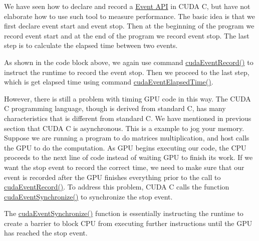 \documentclass[letterpaper,10pt,english]{sphinxmanual}
\begin{document}
We have seen how to declare and record a \href{http://developer.download.nvidia.com/compute/cuda/4\_2/rel/toolkit/docs/online/group\_\_CUDART\_\_MEMORY\_g48efa06b81cc031b2aa6fdc2e9930741.html\#g48efa06b81cc031b2aa6fdc2e9930741}{Event API} in CUDA C, but have not elaborate how to use such tool to measure performance. The basic idea is that we first declare event start and event stop. Then at the beginning of the program we record event start and at the end of the program we record event stop. The last step is to calculate the elapsed time between two events.

As shown in the code block above, we again use command \href{http://developer.download.nvidia.com/compute/cuda/4\_2/rel/toolkit/docs/online/group\_\_CUDART\_\_EVENT\_ga324d5ce3fbf46899b15e5e42ff9cfa5.html\#ga324d5ce3fbf46899b15e5e42ff9cfa5}{cudaEventRecord()} to instruct the runtime to record the event stop. Then we proceed to the last step, which is get elapsed time using command \href{http://developer.download.nvidia.com/compute/cuda/4\_2/rel/toolkit/docs/online/group\_\_CUDART\_\_EVENT\_g14c387cc57ce2e328f6669854e6020a5.html\#g14c387cc57ce2e328f6669854e6020a5}{cudaEventElapsedTime()}.

However, there is still a problem with timing GPU code in this way. The CUDA C programming language, though is derived from standard C, has many characteristics that is different from standard C. We have mentioned in previous section that CUDA C is asynchronous. This is a example to jog your memory. Suppose we are running a program to do matrices multiplication, and host calls the GPU to do the computation. As GPU begins executing our code, the CPU proceeds to the next line of code instead of waiting GPU to finish its work. If we want the stop event to record the correct time, we need to make sure that our event is recorded after the GPU finishes everything prior to the call to \href{http://developer.download.nvidia.com/compute/cuda/4\_2/rel/toolkit/docs/online/group\_\_CUDART\_\_EVENT\_ga324d5ce3fbf46899b15e5e42ff9cfa5.html\#ga324d5ce3fbf46899b15e5e42ff9cfa5}{cudaEventRecord()}. To address this problem, CUDA C calls the function \href{http://developer.download.nvidia.com/compute/cuda/4\_2/rel/toolkit/docs/online/group\_\_CUDART\_\_EVENT\_g08241bcf5c5cb686b1882a8492f1e2d9.html\#g08241bcf5c5cb686b1882a8492f1e2d9}{cudaEventSynchronize()} to synchronize the stop event.

The \href{http://developer.download.nvidia.com/compute/cuda/4\_2/rel/toolkit/docs/online/group\_\_CUDART\_\_EVENT\_g08241bcf5c5cb686b1882a8492f1e2d9.html\#g08241bcf5c5cb686b1882a8492f1e2d9}{cudaEventSynchronize()} function is essentially instructing the runtime to create a barrier to block CPU from executing further instructions until the GPU has reached the stop event.
\end{document}
